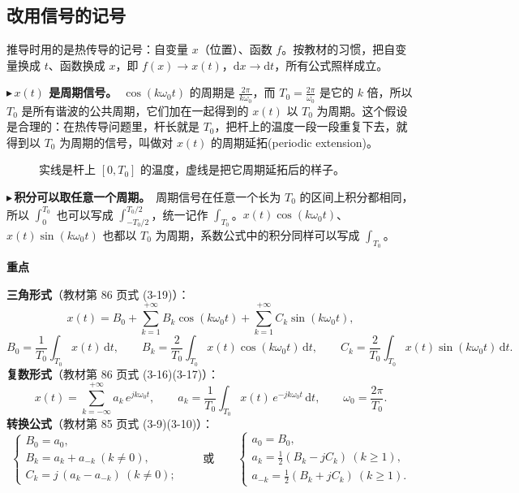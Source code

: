 \documentclass[UTF8,a4paper,11pt]{ctexart}
\newenvironment{remember}{\begin{rememberbox}\textbf{重点}\par\smallskip}{\end{rememberbox}}
\newcommand{\taxes}[5][t]{%
  \draw[->] (#2,0) -- (#3,0) node[right,font=\scriptsize] {$#1$};
  \draw[->] (0,#5) -- (0,#4);
  \node[anchor=north east,font=\tiny,gray!60!black,inner sep=1pt] at (0,-0.02) {$0$};}
\newcommand{\xt}[2]{\draw (#1,0) -- (#1,-0.1) node[anchor=north,font=\tiny,gray!60!black,fill=white,inner sep=0.6pt] {$#2$};}
\newcounter{ex}[section]
\newcommand{\point}[1]{\par\addvspace{1ex}\noindent\textcolor{ptteal}{$\blacktriangleright$\,\textbf{#1}}\ }
\begin{document}
\subsection{改用信号的记号}
推导时用的是热传导的记号：自变量 $x$（位置）、函数 $f$。按教材的习惯，把自变量换成 $t$、函数换成 $x$，即 $f(x)\to x(t)$，$\mathrm{d}x\to\mathrm{d}t$，所有公式照样成立。

\point{$x(t)$ 是周期信号。}$\cos(k\omega_0t)$ 的周期是 $\frac{2\pi}{k\omega_0}$，而 $T_0=\frac{2\pi}{\omega_0}$ 是它的 $k$ 倍，所以 $T_0$ 是所有谐波的公共周期，它们加在一起得到的 $x(t)$ 以 $T_0$ 为周期。这个假设是合理的：在热传导问题里，杆长就是 $T_0$，把杆上的温度一段一段重复下去，就得到以 $T_0$ 为周期的信号，叫做对 $x(t)$ 的周期延拓(periodic extension)。

\begin{figure}[H]
\centering
{}
\caption{实线是杆上 $[0,T_0]$ 的温度，虚线是把它周期延拓后的样子。}
\end{figure}

\point{积分可以取任意一个周期。}周期信号在任意一个长为 $T_0$ 的区间上积分都相同，所以 $\int_0^{T_0}$ 也可以写成 $\int_{-T_0/2}^{T_0/2}$，统一记作 $\int_{T_0}$。$x(t)\cos(k\omega_0t)$、$x(t)\sin(k\omega_0t)$ 也都以 $T_0$ 为周期，系数公式中的积分同样可以写成 $\int_{T_0}$。

\begin{remember}
\textbf{三角形式}（教材第 86 页式 (3-19)）：
\[
x(t)=B_0+\sum_{k=1}^{+\infty}B_k\cos(k\omega_0t)+\sum_{k=1}^{+\infty}C_k\sin(k\omega_0t),
\]
\[
B_0=\frac{1}{T_0}\int_{T_0}x(t)\,\mathrm{d}t,\qquad
B_k=\frac{2}{T_0}\int_{T_0}x(t)\cos(k\omega_0t)\,\mathrm{d}t,\qquad
C_k=\frac{2}{T_0}\int_{T_0}x(t)\sin(k\omega_0t)\,\mathrm{d}t .
\]
\textbf{复数形式}（教材第 86 页式 (3-16)(3-17)）：
\[
x(t)=\sum_{k=-\infty}^{+\infty}a_k\,e^{jk\omega_0t},\qquad
a_k=\frac{1}{T_0}\int_{T_0}x(t)\,e^{-jk\omega_0t}\,\mathrm{d}t,\qquad \omega_0=\frac{2\pi}{T_0}.
\]
\textbf{转换公式}（教材第 85 页式 (3-9)(3-10)）：
\[
\begin{cases}B_0=a_0,\\ B_k=a_k+a_{-k}\ (k\ne0),\\ C_k=j\,(a_k-a_{-k})\ (k\ne0);\end{cases}
\qquad\text{或}\qquad
\begin{cases}a_0=B_0,\\ a_k=\frac12(B_k-jC_k)\ (k\ge1),\\ a_{-k}=\frac12(B_k+jC_k)\ (k\ge1).\end{cases}
\]
\end{remember}
\end{document}
